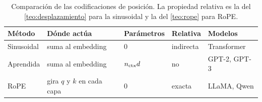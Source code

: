\begin{table}[ht]
\centering\small
\caption{Comparación de las codificaciones de posición. La propiedad relativa es la del \cref{teo:desplazamiento} para la sinusoidal y la del \cref{teo:rope} para RoPE.}\label{tab:posiciones}
\begin{tabular}{@{}lllll@{}}
\toprule
Método & Dónde actúa & Parámetros & Relativa & Modelos \\
\midrule
Sinusoidal & suma al embedding & $0$ & indirecta & Transformer \\
Aprendida & suma al embedding & $n_{\mathrm{ctx}} d$ & no & GPT-2, GPT-3 \\
RoPE & gira $q$ y $k$ en cada capa & $0$ & exacta & LLaMA, Qwen \\
\bottomrule
\end{tabular}
\end{table}

\addtocounter{definicion}{1}%

